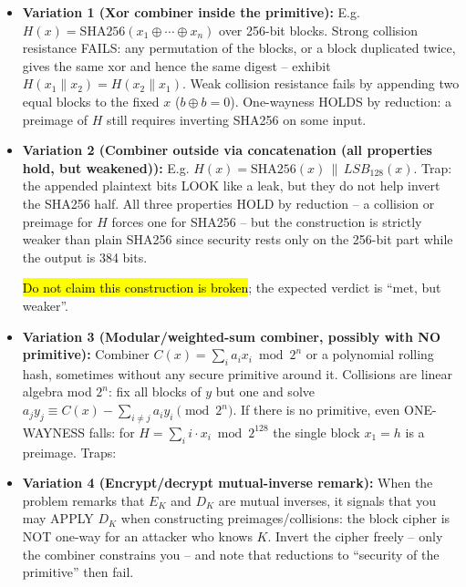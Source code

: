 \documentclass[12pt, a4paper]{article}
\newcommand{\imp}[1]{\hl{#1}}                       %
\begin{document}
\begin{trapbox}
\begin{itemize}
    \item \textbf{Variation 1 (Xor combiner inside the primitive):} E.g. $H(x) = \mathrm{SHA256}(x_1 \oplus \cdots \oplus x_n)$ over 256-bit blocks. Strong collision resistance FAILS: any permutation of the blocks, or a block duplicated twice, gives the same xor and hence the same digest -- exhibit $H(x_1 \| x_2) = H(x_2 \| x_1)$.
    Weak collision resistance fails by appending two equal blocks to the fixed $x$ ($b \oplus b = 0$). One-wayness HOLDS by reduction: a preimage of $H$ still requires inverting SHA256 on some input.
    \item \textbf{Variation 2 (Combiner outside via concatenation (all properties hold, but weakened)):} E.g. $H(x) = \mathrm{SHA256}(x) \,\|\, LSB_{128}(x)$. Trap: the appended plaintext bits LOOK like a leak, but they do not help invert the SHA256 half.
    All three properties HOLD by reduction -- a collision or preimage for $H$ forces one for SHA256 -- but the construction is strictly weaker than plain SHA256 since security rests only on the 256-bit part while the output is 384 bits.

    \imp{Do not claim this construction is broken}; the expected verdict is ``met, but weaker''.
    \item \textbf{Variation 3 (Modular/weighted-sum combiner, possibly with NO primitive):} Combiner $C(x) = \sum_i a_i x_i \bmod 2^n$ or a polynomial rolling hash, sometimes without any secure primitive around it.
    Collisions are linear algebra mod $2^n$: fix all blocks of $y$ but one and solve $a_j y_j \equiv C(x) - \sum_{i \neq j} a_i y_i \pmod{2^n}$.
    If there is no primitive, even ONE-WAYNESS falls: for $H = \sum_i i \cdot x_i \bmod 2^{128}$ the single block $x_1 = h$ is a preimage. Traps:
    \item \textbf{Variation 4 (Encrypt/decrypt mutual-inverse remark):} When the problem remarks that $E_K$ and $D_K$ are mutual inverses, it signals that you may APPLY $D_K$ when constructing preimages/collisions: the block cipher is NOT one-way for an attacker who knows $K$.
    Invert the cipher freely -- only the combiner constrains you -- and note that reductions to ``security of the primitive'' then fail.
\end{itemize}
\end{trapbox}
\end{document}

